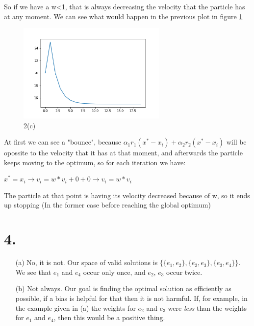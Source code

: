 \documentclass{scrartcl}
\begin{document}
So if we have a w<1, that is always decreasing the velocity that the
particle has at any moment. We can see what would happen in the previous
plot in figure \ref{fig:2c}

\begin{figure}
  \centering
  \includegraphics[width=0.65\textwidth]{images/2c.png}
  \caption{2(c)}
  \label{fig:2c}
\end{figure}

At first we can see a "bounce", because $\alpha _1 r_1 (x^{*} - x_i) + \alpha _2 r_2 (x^{*} - x_i)$ will be opossite to the velocity that it has at that moment, and afterwards the particle keeps moving to the optimum, so for each iteration we have:

$x^{*} = x_i \rightarrow v_i = w*v_i +0 +0 \rightarrow v_i = w*v_i$

The particle at that point is having its velocity decreased because of w, so it ends up stopping (In the former case before reaching the global optimum)

\section*{4.}

\begin{itemize}

  \item[(a)]
    No, it is not. Our space of valid solutions is $\{\{e_1, e_2\}, \{e_2,
    e_3\}, \{e_3, e_4\}\}$. We see that $e_1$ and $e_4$ occur only once,
    and $e_2$, $e_3$ occur twice.

  \item[(b)]
    Not always. Our goal is finding the optimal solution as efficiently as
    possible, if a bias is helpful for that then it is not harmful. If,
    for example, in the example given in (a) the weights for $e_2$ and
    $e_3$ were \emph{less} than the weights for $e_1$ and $e_4$, then this
    would be a positive thing.

\end{itemize}
\end{document}
